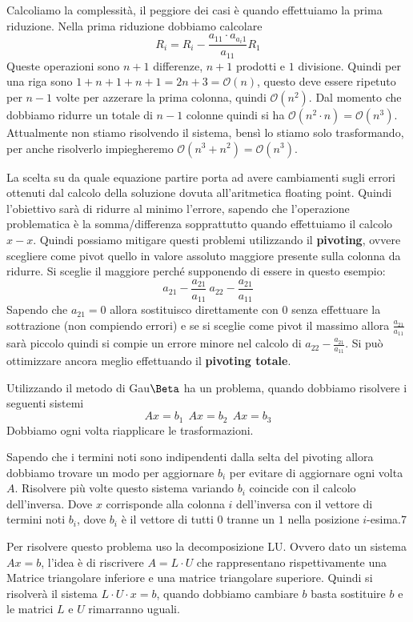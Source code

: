 Calcoliamo la complessità, il peggiore dei casi è quando effettuiamo la prima riduzione.
Nella prima riduzione dobbiamo calcolare 
$$R_i = R_i - \frac{a_{11}\cdot a_{a_i1}}{a_{11}} R_1$$
Queste operazioni sono $n+1$ differenze, $n+1$ prodotti e  $1$ divisione. Quindi 
per una riga sono $1+n+1+n+1=2n+3=\mathcal{O}(n)$, questo deve essere ripetuto per $n-1$
volte per azzerare la prima colonna, quindi $\mathcal{O}(n^2)$. Dal momento che dobbiamo 
ridurre un totale di $n-1$ colonne quindi si ha $\mathcal{O}(n^2\cdot n) = \mathcal{O}(n^3)$.
Attualmente non stiamo risolvendo il sistema, bensì lo stiamo solo trasformando, 
per anche risolverlo impiegheremo  $\mathcal{O}(n^3+ n^2) =\mathcal{O}(n^3)$.

La scelta su da quale equazione partire porta ad avere cambiamenti sugli errori 
ottenuti dal calcolo della soluzione dovuta all'aritmetica floating point. Quindi 
l'obiettivo sarà di ridurre al minimo l'errore, sapendo che l'operazione problematica 
è la somma/differenza sopprattutto quando effettuiamo il calcolo $x-x$. Quindi 
possiamo mitigare questi problemi utilizzando il \textbf{pivoting}, ovvere scegliere 
come pivot quello in valore assoluto maggiore presente sulla colonna da ridurre.  
Si sceglie il maggiore perché supponendo di essere in questo esempio:
$$a_{21} - \frac{a_{21}}{a_11} \ a_{22}-\frac{a_{21}}{a_11}$$
Sapendo che $a_{21}=0$ allora sostituisco direttamente con $0$ senza effettuare 
la sottrazione (non compiendo errori) e se si sceglie come pivot il massimo allora 
$\frac{a_{21}}{a_11}$ sarà piccolo quindi si compie un errore minore nel calcolo 
di $a_{22}-\frac{a_{21}}{a_11}$. Si può ottimizzare ancora meglio effettuando il 
\textbf{pivoting totale}. 

Utilizzando il metodo di Gau$\Beta$ ha un problema, quando dobbiamo risolvere i 
seguenti sistemi
$$Ax= b_1 \ \ Ax=b_2 \ \ Ax=b_3$$
Dobbiamo ogni volta riapplicare le trasformazioni. 

Sapendo che i termini noti sono indipendenti dalla selta del pivoting allora dobbiamo
trovare un modo per aggiornare $b_i$ per evitare di aggiornare ogni volta $A$. 
Risolvere più volte questo sistema variando $b_i$ coincide con il calcolo dell'inversa.
Dove $x$ corrisponde alla colonna $i$ dell'inversa con il vettore di termini noti $b_i$,
dove $b_i$ è il vettore di tutti $0$ tranne un $1$ nella posizione $i$-esima.7

Per risolvere questo problema uso la decomposizione LU. Ovvero dato un sistema $Ax=b$,
l'idea è di riscrivere $A=L\cdot U$ che rappresentano rispettivamente una Matrice
triangolare inferiore e una matrice triangolare superiore. Quindi si risolverà 
il sistema $L\cdot U \cdot x =b$, quando dobbiamo cambiare $b$ basta sostituire 
$b$ e le matrici $L$ e $U$ rimarranno uguali.

